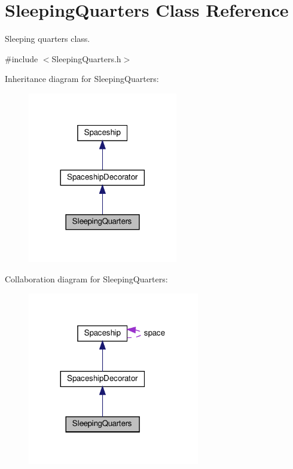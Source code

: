 \hypertarget{classSleepingQuarters}{}\section{Sleeping\+Quarters Class Reference}
\label{classSleepingQuarters}


Sleeping quarters class.  




{\ttfamily \#include $<$Sleeping\+Quarters.\+h$>$}



Inheritance diagram for Sleeping\+Quarters\+:\nopagebreak
\begin{figure}[H]
\begin{center}
\leavevmode
\includegraphics[width=185pt]{classSleepingQuarters__inherit__graph}
\end{center}
\end{figure}


Collaboration diagram for Sleeping\+Quarters\+:\nopagebreak
\begin{figure}[H]
\begin{center}
\leavevmode
\includegraphics[width=212pt]{classSleepingQuarters__coll__graph}
\end{center}
\end{figure}
